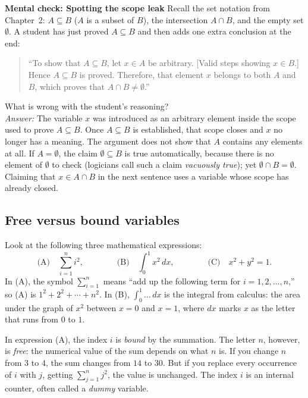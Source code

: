 \begin{recoverybox}
\textbf{Mental check: Spotting the scope leak}
Recall the set notation from Chapter~2: $A \subseteq B$ ($A$ is a subset of $B$), the intersection $A \cap B$, and the empty set $\emptyset$. A student has just proved $A \subseteq B$ and then adds one extra conclusion at the end:
\begin{quote}
``To show that $A \subseteq B$, let $x \in A$ be arbitrary. [Valid steps showing $x \in B$.] Hence $A \subseteq B$ is proved. Therefore, that element $x$ belongs to both $A$ and $B$, which proves that $A \cap B \neq \emptyset$.''
\end{quote}
What is wrong with the student's reasoning?
\\[0.3em]
\emph{Answer:} The variable $x$ was introduced as an arbitrary element inside the scope used to prove $A \subseteq B$. Once $A \subseteq B$ is established, that scope closes and $x$ no longer has a meaning. The argument does not show that $A$ contains any elements at all. If $A = \emptyset$, the claim $\emptyset \subseteq B$ is true automatically, because there is no element of $\emptyset$ to check (logicians call such a claim \emph{vacuously true}); yet $\emptyset \cap B = \emptyset$. Claiming that $x \in A \cap B$ in the next sentence uses a variable whose scope has already closed.
\end{recoverybox}

\subsection{Free versus bound variables}

Look at the following three mathematical expressions:
\[
\text{(A)}\quad \sum_{i=1}^n i^2, \qquad\qquad \text{(B)}\quad \int_0^1 x^2 \, dx, \qquad\qquad \text{(C)}\quad x^2 + y^2 = 1.
\]
In (A), the symbol $\sum_{i=1}^n$ means ``add up the following term for $i = 1, 2, \ldots, n$,'' so (A) is $1^2 + 2^2 + \cdots + n^2$. In (B), $\int_0^1 \ldots \, dx$ is the integral from calculus: the area under the graph of $x^2$ between $x = 0$ and $x = 1$, where $dx$ marks $x$ as the letter that runs from $0$ to $1$.

In expression (A), the index $i$ is \emph{bound} by the summation. The letter $n$, however, is \emph{free}: the numerical value of the sum depends on what $n$ is. If you change $n$ from $3$ to $4$, the sum changes from $14$ to $30$. But if you replace every occurrence of $i$ with $j$, getting $\sum_{j=1}^n j^2$, the value is unchanged. The index $i$ is an internal counter, often called a \emph{dummy} variable.

